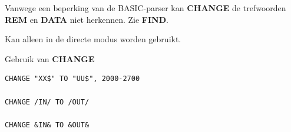 \begin{description}[leftmargin=2cm,style=nextline]
                  Vanwege een beperking van de BASIC-parser kan {\bf CHANGE} de trefwoorden {\bf REM} en {\bf DATA} niet herkennen. Zie {\bf FIND}.

                  Kan alleen in de directe modus worden gebruikt.

\item [Voorbeelden:] Gebruik van {\bf CHANGE}

\begin{tcolorbox}[colback=black,coltext=white]
\verbatimfont{\codefont}
\begin{verbatim}
CHANGE "XX$" TO "UU$", 2000-2700

CHANGE /IN/ TO /OUT/

CHANGE &IN& TO &OUT&
\end{verbatim}
\end{tcolorbox}
\end{description}


\newpage
